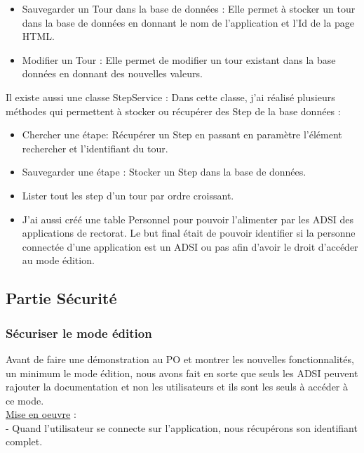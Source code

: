 \documentclass[12pt]{article}
\begin{document}
\begin{itemize}
\begin{itemize}
\item Sauvegarder un Tour dans la base de données : Elle permet à stocker un tour dans la base de données en donnant le nom de l'application et l'Id de la page HTML. 

\item Modifier un Tour : Elle permet de modifier un tour existant dans la base données en donnant des nouvelles valeurs. 
\end{itemize}

Il existe aussi une classe StepService : Dans cette classe, j'ai réalisé plusieurs méthodes qui permettent à stocker ou récupérer des Step de la base données : 
\begin{itemize}

\item  Chercher une étape: Récupérer un Step en passant en paramètre l'élément rechercher et l'identifiant du tour.

\item Sauvegarder une étape : Stocker un Step dans la base de données.

\item Lister tout les step d'un tour par ordre croissant.  


\item J'ai aussi créé une table Personnel pour pouvoir l'alimenter par les ADSI des applications de rectorat. Le but final était de pouvoir identifier si la personne connectée d'une application est un ADSI ou pas afin d'avoir le droit d'accéder au mode édition. 

\end{itemize}
\end{itemize}
\subsection{Partie Sécurité}

\subsubsection{Sécuriser le mode édition}
	
	Avant de faire une démonstration au PO et montrer les nouvelles fonctionnalités, un minimum le mode édition, nous avons fait en sorte que seuls les ADSI peuvent rajouter la documentation et non les utilisateurs et ils sont les seuls à accéder à ce mode.\\   
  
  
\underline{Mise en oeuvre} : \\
- Quand l'utilisateur se connecte sur l'application, nous récupérons son identifiant complet.
\end{document}
